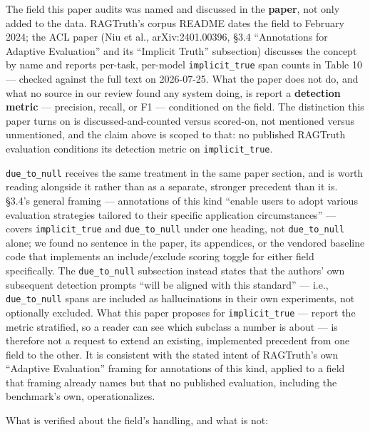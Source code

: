 \documentclass[11pt]{article}
\begin{document}
The field this paper audits was named and discussed in the \textbf{paper}, not only added to the
data. RAGTruth's corpus README dates the field to February 2024; the ACL paper (Niu et al.,
arXiv:2401.00396, §3.4 ``Annotations for Adaptive Evaluation'' and its ``Implicit Truth''
subsection) discusses the concept by name and reports per-task, per-model \texttt{implicit\_true}
span counts in Table 10 --- checked against the full text on 2026-07-25. What the paper does
not do, and what no source in our review found any system doing, is report a \textbf{detection
metric} --- precision, recall, or F1 --- conditioned on the field. The distinction this paper
turns on is discussed-and-counted versus scored-on, not mentioned versus unmentioned, and the
claim above is scoped to that: no published RAGTruth evaluation conditions its detection
metric on \texttt{implicit\_true}.

\texttt{due\_to\_null} receives the same treatment in the same paper section, and is worth reading
alongside it rather than as a separate, stronger precedent than it is. §3.4's general
framing --- annotations of this kind ``enable users to adopt various evaluation strategies
tailored to their specific application circumstances'' --- covers \texttt{implicit\_true} and
\texttt{due\_to\_null} under one heading, not \texttt{due\_to\_null} alone; we found no sentence in the paper,
its appendices, or the vendored baseline code that implements an include/exclude scoring
toggle for either field specifically. The \texttt{due\_to\_null} subsection instead states that the
authors' own subsequent detection prompts ``will be aligned with this standard'' --- i.e.,
\texttt{due\_to\_null} spans are included as hallucinations in their own experiments, not optionally
excluded. What this paper proposes for \texttt{implicit\_true} --- report the metric stratified, so a
reader can see which subclass a number is about --- is therefore not a request to extend an
existing, implemented precedent from one field to the other. It is consistent with the
stated intent of RAGTruth's own ``Adaptive Evaluation'' framing for annotations of this kind,
applied to a field that framing already names but that no published evaluation, including
the benchmark's own, operationalizes.

What is verified about the field's handling, and what is not:
\end{document}
